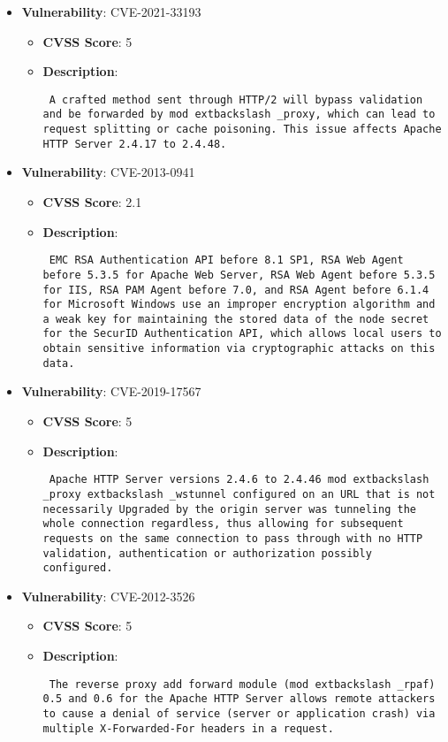 \documentclass{article}
\begin{document}
\begin{itemize}
        \item \textbf{Vulnerability}: CVE-2021-33193
        \begin{itemize}
            \item \textbf{CVSS Score}:  5 
            \item \textbf{Description}: \parbox{\linewidth}{\texttt{ A crafted method sent through HTTP/2 will bypass validation and be forwarded by mod	extbackslash _proxy, which can lead to request splitting or cache poisoning. This issue affects Apache HTTP Server 2.4.17 to 2.4.48. }}
        \end{itemize}
    
        \item \textbf{Vulnerability}: CVE-2013-0941
        \begin{itemize}
            \item \textbf{CVSS Score}:  2.1 
            \item \textbf{Description}: \parbox{\linewidth}{\texttt{ EMC RSA Authentication API before 8.1 SP1, RSA Web Agent before 5.3.5 for Apache Web Server, RSA Web Agent before 5.3.5 for IIS, RSA PAM Agent before 7.0, and RSA Agent before 6.1.4 for Microsoft Windows use an improper encryption algorithm and a weak key for maintaining the stored data of the node secret for the SecurID Authentication API, which allows local users to obtain sensitive information via cryptographic attacks on this data. }}
        \end{itemize}
    
        \item \textbf{Vulnerability}: CVE-2019-17567
        \begin{itemize}
            \item \textbf{CVSS Score}:  5 
            \item \textbf{Description}: \parbox{\linewidth}{\texttt{ Apache HTTP Server versions 2.4.6 to 2.4.46 mod	extbackslash _proxy	extbackslash _wstunnel configured on an URL that is not necessarily Upgraded by the origin server was tunneling the whole connection regardless, thus allowing for subsequent requests on the same connection to pass through with no HTTP validation, authentication or authorization possibly configured. }}
        \end{itemize}
    
        \item \textbf{Vulnerability}: CVE-2012-3526
        \begin{itemize}
            \item \textbf{CVSS Score}:  5 
            \item \textbf{Description}: \parbox{\linewidth}{\texttt{ The reverse proxy add forward module (mod	extbackslash _rpaf) 0.5 and 0.6 for the Apache HTTP Server allows remote attackers to cause a denial of service (server or application crash) via multiple X-Forwarded-For headers in a request. }}
        \end{itemize}
    

\end{itemize}
\end{document}
